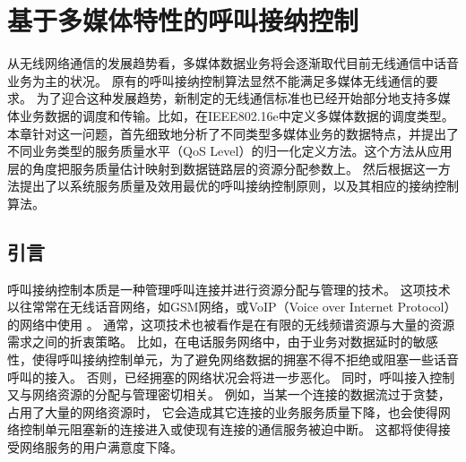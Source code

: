 \graphicspath{ {../body/cacop_figures/}}
\chapter{基于多媒体特性的呼叫接纳控制}
\label{chap_cacop}

从无线网络通信的发展趋势看，多媒体数据业务将会逐渐取代目前无线通信中话音业务为主的状况。
原有的呼叫接纳控制算法显然不能满足多媒体无线通信的要求。
为了迎合这种发展趋势，新制定的无线通信标准也已经开始部分地支持多媒体业务数据的调度和传输。比如，在IEEE802.16e中定义多媒体数据的调度类型。
本章针对这一问题，首先细致地分析了不同类型多媒体业务的数据特点，并提出了不同业务类型的服务质量水平（QoS Level）的归一化定义方法。这个方法从应用层的角度把服务质量估计映射到数据链路层的资源分配参数上。
然后根据这一方法提出了以系统服务质量及效用最优的呼叫接纳控制原则，以及其相应的接纳控制算法。

\section{引言}
呼叫接纳控制本质是一种管理呼叫连接并进行资源分配与管理的技术。
这项技术以往常常在无线话音网络，如GSM网络，或VoIP（Voice over Internet Protocol）的网络中使用\cite{Perros1996}\cite{Mase2004}
\cite{Systems_2001}\cite{Y-G-Fang.TVT.2002}\cite{Y-Xiao.IEICE.TC.2001}。
通常，这项技术也被看作是在有限的无线频谱资源与大量的资源需求之间的折衷策略。
比如，在电话服务网络中，由于业务对数据延时的敏感性，使得呼叫接纳控制单元，为了避免网络数据的拥塞不得不拒绝或阻塞一些话音呼叫的接入。
否则，已经拥塞的网络状况会将进一步恶化。
同时，呼叫接入控制又与网络资源的分配与管理密切相关。
例如，当某一个连接的数据流过于贪婪，占用了大量的网络资源时，
它会造成其它连接的业务服务质量下降，也会使得网络控制单元阻塞新的连接进入或使现有连接的通信服务被迫中断。
这都将使得接受网络服务的用户满意度下降。

